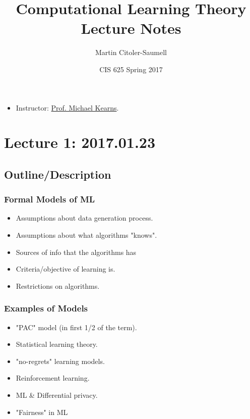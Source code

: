 \documentclass[12pt, letterpaper]{article}
\title{Computational Learning Theory Lecture Notes}
\author{Martin Citoler-Saumell}
\date{CIS 625 Spring 2017}
\theoremstyle{definition}
\theoremstyle{remark}
\begin{document}
\maketitle

\begin{itemize}
	\item Instructor: \href{http://www.cis.upenn.edu/~mkearns/}{Prof. Michael Kearns}.
\end{itemize}


\section{Lecture 1: 2017.01.23}

\subsection{Outline/Description}

\subsubsection{Formal Models of ML}

\begin{itemize}
	\item Assumptions about data generation process.
	\item Assumptions about what algorithms "knows".
	\item Sources of info that the algorithms has
	\item Criteria/objective of learning is.
	\item Restrictions on algorithms.
\end{itemize}
	
\subsubsection{Examples of Models}

\begin{itemize}
	\item "PAC" model (in first 1/2 of the term).
	\item Statistical learning theory.
	\item "no-regrets" learning models.
	\item Reinforcement learning.
	\item ML \& Differential privacy.
	\item "Fairness" in ML
\end{itemize}
\end{document}
